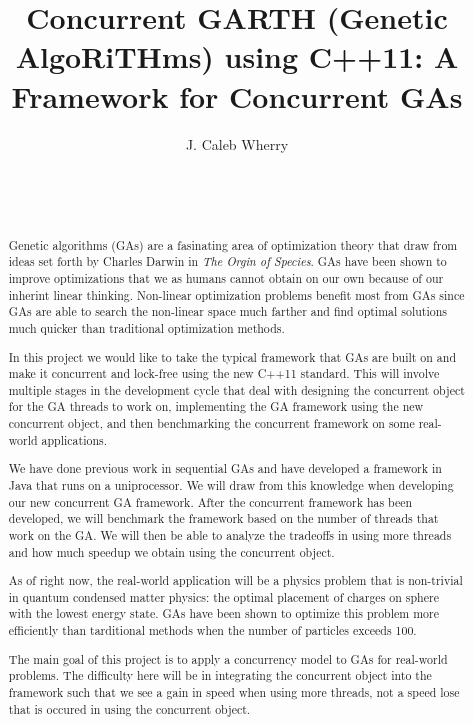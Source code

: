 \documentclass{acm_proc_article-sp}
\begin{document}
\title{
Concurrent GARTH (Genetic AlgoRiTHms) using C++11: A Framework for Concurrent GAs
}


\author{
\alignauthor
J. Caleb Wherry \\
   \\
   \\
   \\
}

\maketitle


%
%
\begin{abstract}
Genetic algorithms (GAs) are a fasinating area of optimization theory that draw from ideas set forth by Charles Darwin in \emph{The Orgin of Species}. GAs have been shown to improve optimizations that we as humans cannot obtain on our own because of our inherint linear thinking. Non-linear optimization problems benefit most from GAs since GAs are able to search the non-linear space much farther and find optimal solutions much quicker than traditional optimization methods.

In this project we would like to take the typical framework that GAs are built on and make it concurrent and lock-free using the new C++11 standard. This will involve multiple stages in the development cycle that deal with designing the concurrent object for the GA threads to work on, implementing the GA framework using the new concurrent object, and then benchmarking the concurrent framework on some real-world applications.

We have done previous work in sequential GAs and have developed a framework in Java that runs on a uniprocessor. We will draw from this knowledge when developing our new concurrent GA framework. After the concurrent framework has been developed, we will benchmark the framework based on the number of threads that work on the GA. We will then be able to analyze the tradeoffs in using more threads and how much speedup we obtain using the concurrent object.

As of right now, the real-world application will be a physics problem that is non-trivial in quantum condensed matter physics: the optimal placement of charges on sphere with the lowest energy state\cite{pang:compphys}. GAs have been shown to optimize this problem more efficiently than tarditional methods when the number of particles exceeds 100.

The main goal of this project is to apply a concurrency model to GAs for real-world problems. The difficulty here will be in integrating the concurrent object into the framework such that we see a gain in speed when using more threads, not a speed lose that is occured in using the concurrent object.
\end{abstract}
\end{document}
